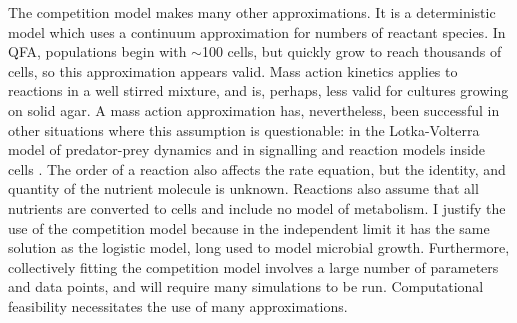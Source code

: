 The competition model makes many other approximations. It is a
deterministic model which uses a continuum approximation for numbers
of reactant species. In QFA, populations begin with \(\sim\)100 cells,
but quickly grow to reach thousands of cells, so this approximation
appears valid. Mass action kinetics applies to reactions in a well
stirred mixture, and is, perhaps, less valid for cultures growing on
solid agar. A mass action approximation has, nevertheless, been
successful in other situations where this assumption is questionable:
in the Lotka-Volterra model of predator-prey dynamics
\citep{Berryman1992} and in signalling and reaction models inside
cells \citep{Aldridge2006,Chen2010}. The order of a reaction also
affects the rate equation, but the identity, and quantity of the
nutrient molecule is unknown. Reactions also assume that all nutrients
are converted to cells and include no model of metabolism. I justify
the use of the competition model because in the independent limit it
has the same solution as the logistic model, long used to model
microbial growth. Furthermore, collectively fitting the competition
model involves a large number of parameters and data points, and will
require many simulations to be run. Computational feasibility
necessitates the use of many approximations.




